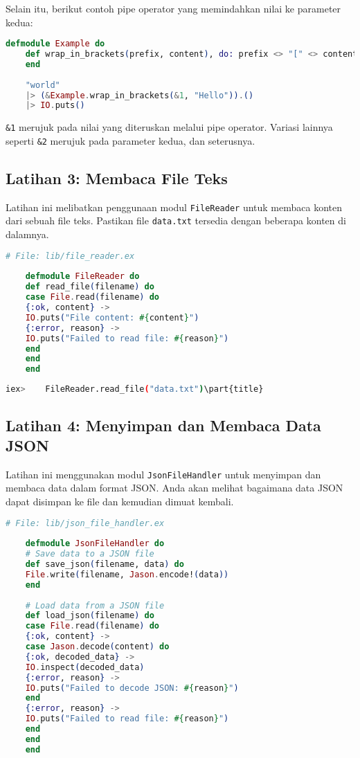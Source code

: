 Selain itu, berikut contoh pipe operator yang memindahkan nilai ke parameter kedua:

\begin{lstlisting}[language=Elixir]
	defmodule Example do
	def wrap_in_brackets(prefix, content), do: prefix <> "[" <> content <> "]"
	end
	
	"world"
	|> (&Example.wrap_in_brackets(&1, "Hello")).()
	|> IO.puts()
\end{lstlisting}

\texttt{\&1} merujuk pada nilai yang diteruskan melalui pipe operator. Variasi lainnya seperti \texttt{\&2} merujuk pada parameter kedua, dan seterusnya.

\subsection{Latihan 3: Membaca File Teks}

Latihan ini melibatkan penggunaan modul \texttt{FileReader} untuk membaca konten dari sebuah file teks. Pastikan file \texttt{data.txt} tersedia dengan beberapa konten di dalamnya.

\begin{lstlisting}[language=Elixir]
	# File: lib/file_reader.ex
	
	defmodule FileReader do
	def read_file(filename) do
	case File.read(filename) do
	{:ok, content} ->
	IO.puts("File content: #{content}")
	{:error, reason} ->
	IO.puts("Failed to read file: #{reason}")
	end
	end
	end
\end{lstlisting}

\begin{lstlisting}[language=bash]
	iex> 	FileReader.read_file("data.txt")\part{title}
\end{lstlisting}

\subsection{Latihan 4: Menyimpan dan Membaca Data JSON}

Latihan ini menggunakan modul \texttt{JsonFileHandler} untuk menyimpan dan membaca data dalam format JSON. Anda akan melihat bagaimana data JSON dapat disimpan ke file dan kemudian dimuat kembali.

\begin{lstlisting}[language=Elixir]
	# File: lib/json_file_handler.ex
	
	defmodule JsonFileHandler do
	# Save data to a JSON file
	def save_json(filename, data) do
	File.write(filename, Jason.encode!(data))
	end
	
	# Load data from a JSON file
	def load_json(filename) do
	case File.read(filename) do
	{:ok, content} ->
	case Jason.decode(content) do
	{:ok, decoded_data} ->
	IO.inspect(decoded_data)
	{:error, reason} ->
	IO.puts("Failed to decode JSON: #{reason}")
	end
	{:error, reason} ->
	IO.puts("Failed to read file: #{reason}")
	end
	end
	end
	
\end{lstlisting}

